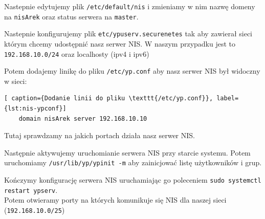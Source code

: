 \clearpage
Nastepnie edytujemy plik \texttt{/etc/default/nis} i zmieniamy w nim nazwę domeny na \texttt{nisArek} oraz status serwera na \texttt{master}.\\


\vspace{-1cm}
Nastepnie konfigurujemy plik \texttt{etc/ypuserv.securenetes} tak aby zawierał sieci którym chcemy udostępnić nasz serwer NIS. W naszym przypadku jest to \texttt{192.168.10.0/24} oraz localhosty (ipv4 i ipv6)\\
\clearpage

Potem dodajemy linikę do pliku \texttt{/etc/yp.conf} aby nasz serwer NIS był widoczny w sieci:\\
\begin{lstlisting}[ caption={Dodanie linii do pliku \texttt{/etc/yp.conf}}, label={lst:nis-ypconf}]
	domain nisArek server 192.168.10.10
	\end{lstlisting}
Tutaj sprawdzamy na jakich portach działa nasz serwer NIS.\\

Następnie aktywujemy uruchomianie serwera NIS przy starcie systemu.
\clearpage
Potem uruchomiamy \texttt{/usr/lib/yp/ypinit -m} aby zainicjować listę użytkowników i grup.\\

\clearpage
Kończymy konfigurację serwera NIS uruchamiając go poleceniem \texttt{sudo systemctl restart ypserv}.\\
Potem otwieramy porty na których komunikuje się NIS dla naszej sieci (\texttt{192.168.10.0/25})\\
\clearpage

